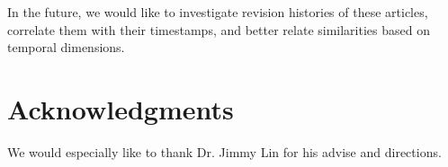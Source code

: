 \documentclass{acm_proc_article-sp}
\begin{document}
In the future, we would like to investigate revision histories of these articles, correlate them with their timestamps, and better relate similarities based on temporal dimensions. 

\section{Acknowledgments}
We would especially like to thank Dr. Jimmy Lin for his advise and directions.



\balancecolumns
\end{document}
